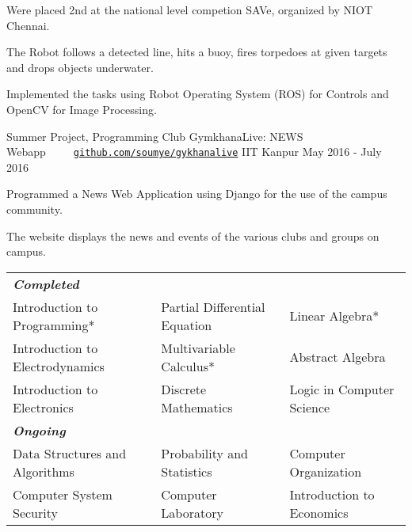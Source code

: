 \documentclass[11pt, a4paper]{awesome-cv}
\begin{document}
{{{\begin{cventries}
{\begin{cvitems}
        \item {Were placed 2nd at the national level competion SAVe, organized by NIOT Chennai.}
        \item {The Robot follows a detected line, hits a buoy, fires torpedoes at given targets and drops objects underwater.}
        \item {Implemented the tasks using Robot Operating System (ROS) for Controls and OpenCV for Image Processing.}        
      \end{cvitems}
    }
  \cventry
    {Summer Project, Programming Club}
    {GymkhanaLive: NEWS Webapp\ \ \ \ \  \texttt{\href{https://github.com/soumye/gymkhanalive}{github.com/soumye/gykhanalive}}}
    {IIT Kanpur}	
    {May 2016 - July 2016}
    {
      \begin{cvitems}
    	\item Programmed a News Web Application using Django for the use of the campus community.
    	\item The website displays the news and events of the various clubs and groups on campus.
      \end{cvitems}
    }
\end{cventries}

{\fontsize{11pt}{1em}\bodyfontlight\upshape\color{text}
\begin{tabular}{l l l}
\textbf{\textit{Completed}}\\
 Introduction to Programming* & Partial Differential Equation & Linear Algebra*\\ 
 Introduction to Electrodynamics & Multivariable Calculus* & Abstract Algebra\\
 Introduction to Electronics & Discrete Mathematics & Logic in Computer Science\\
\textbf{\textit{Ongoing}}\\
 Data Structures and Algorithms & Probability and Statistics & Computer Organization\\
 Computer System Security & Computer Laboratory & Introduction to Economics\\


\end{tabular}}}}}
\end{document}

